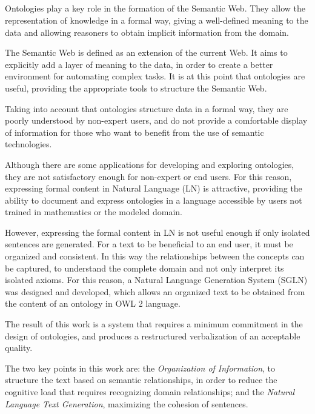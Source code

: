 \ \\
\ \\
\label{pagsumm}
\\ \\
Ontologies play a key role in the formation of the Semantic Web. They allow the representation of knowledge in a formal way, giving a well-defined meaning to the data and allowing reasoners to obtain implicit information from the domain.

The Semantic Web is defined as an extension of the current Web. It aims to explicitly add a layer of meaning to the data, in order to create a better environment for automating complex tasks. It is at this point that ontologies are useful, providing the appropriate tools to structure the Semantic Web.

Taking into account that ontologies structure data in a formal way, they are poorly understood by non-expert users, and do not provide a comfortable display of information for those who want to benefit from the use of semantic technologies.

Although there are some applications for developing and exploring ontologies, they are not satisfactory enough for non-expert or end users.
For this reason, expressing formal content in Natural Language (LN) is attractive, providing the ability to document and express ontologies in a language accessible by users not trained in mathematics or the modeled domain.


However, expressing the formal content in LN is not useful enough if only isolated sentences are generated. For a text to be beneficial to an end user, it must be organized and consistent. In this way the relationships between the concepts can be captured, to understand the complete domain and not only interpret its isolated axioms. For this reason, a Natural Language Generation System (SGLN) was designed and developed, which allows an organized text to be obtained from the content of an ontology in OWL 2 language.


The result of this work is a system that requires a minimum commitment in the design of ontologies, and produces a restructured verbalization of an acceptable quality.

The two key points in this work are: the \textit{Organization of Information}, to structure the text based on semantic relationships, in order to reduce the cognitive load that requires recognizing domain relationships; and the \textit{Natural Language Text Generation}, maximizing the cohesion of sentences.


\vfill
\pagebreak
